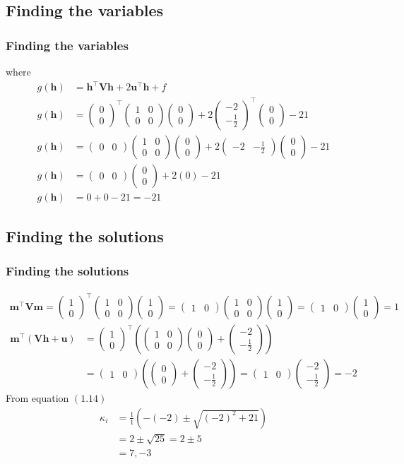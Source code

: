 \documentclass{beamer}
\providecommand{\brak}[1]{\ensuremath{\left(#1\right)}}
\theoremstyle{remark}
\newcommand{\myvec}[1]{\ensuremath{\begin{pmatrix}#1\end{pmatrix}}}
\let\vec\mathbf
\numberwithin{equation}{section}
\begin{document}
 \subsection{Finding the variables}
\begin{frame}
\frametitle{Finding the variables}
where
\begin{align}
g\brak{\vec{h}} &= \vec{h}^\top\vec{V}\vec{h}+2\vec{u}^\top\vec{h}+f \\
g\brak{\vec{h}} &= \myvec{0\\0}^\top\myvec{1&0\\0&0}\myvec{0\\0}+2\myvec{-2\\-\frac{1}{2}}^\top\myvec{0\\0}-21 \\
g\brak{\vec{h}} &= \myvec{0&0}\myvec{1&0\\0&0}\myvec{0\\0}+2\myvec{-2&-\frac{1}{2}}\myvec{0\\0}-21 \\
g\brak{\vec{h}} &= \myvec{0&0}\myvec{0\\0}+2\brak{0}-21 \\
g\brak{\vec{h}} &= 0+0-21=-21
\end{align}
 \end{frame}
\begin{frame}
\subsection{Finding the solutions}
\frametitle{Finding the solutions}
  \begin{align}
     \vec{m}^\top \vec{V}\vec{m}=\myvec{1\\0}^\top\myvec{1&0\\0&0}\myvec{1\\0}=\myvec{1&0}\myvec{1&0\\0&0}\myvec{1\\0}=\myvec{1&0}\myvec{1\\0}=1
     \end{align}
 \begin{align}
    \vec{m}^\top\brak{\vec{V}\vec{h}+\vec{u}}
    &= \myvec{1\\0}^\top\brak{\myvec{1&0\\0&0}\myvec{0\\0}+\myvec{-2\\-\frac{1}{2}}} \nonumber \\&=\myvec{1&0}\brak{\myvec{0\\0}+\myvec{-2\\-\frac{1}{2}}}=
    \myvec{1&0}\myvec{-2\\-\frac{1}{2}}=-2
\end{align}
From equation \brak{1.14}
\begin{align}
\kappa_i&= \frac{1}{1}\brak{-\brak{-2}\pm\sqrt{\brak{-2}^2+21}}\\
&=2\pm\sqrt{25}=2\pm5 \\
&=7,-3
\end{align}
\end{frame}
\end{document}
